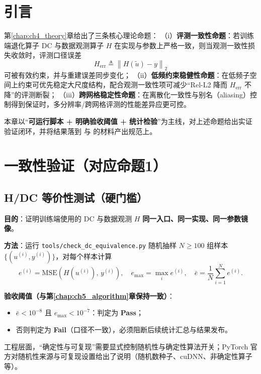 \section{引言}
第\ref{chap:ch4_theory}章给出了三条核心理论命题：
（i）\textbf{评测一致性命题}：若训练端退化算子 $\mathrm{DC}$ 与数据观测算子 $H$ 在实现与参数上严格一致，则当观测一致性损失收敛时，评测口径误差
\begin{equation}
H_{\mathrm{err}} \triangleq \left\| H(\tilde{u}) - y \right\|_2
\end{equation}
可被有效约束，并与重建误差同步变化；
（ii）\textbf{低频约束稳健性命题}：在低频子空间上约束可优先稳定大尺度结构，配合观测一致性项可减少“Rel-L2 降而 $H_{\mathrm{err}}$ 不降”的评测断裂；
（iii）\textbf{跨网格稳定性命题}：在离散化一致性与别名（aliasing）控制得到保证时，多分辨率/跨网格评测的性能差异应更可控。

本章以“\textbf{可运行脚本 + 明确验收阈值 + 统计检验}”为主线，对上述命题给出实证验证闭环，并将结果落到  与  的材料产出规范上。

\section{一致性验证（对应命题1）}

\subsection{H/DC 等价性测试（硬门槛）}
\textbf{目的}：证明训练端使用的 $\mathrm{DC}$ 与数据观测 $H$ \textbf{同一入口、同一实现、同一参数镜像}。

\textbf{方法}：运行 \texttt{tools/check\_dc\_equivalence.py} 随机抽样 $N\ge 100$ 组样本 $\{(u^{(i)}, y^{(i)})\}$，对每个样本计算
\begin{equation}
e^{(i)}=\mathrm{MSE}\!\left(H(u^{(i)}),\, y^{(i)}\right),
\quad
e_{\max}=\max_i e^{(i)},\quad
\bar{e}=\frac{1}{N}\sum_{i=1}^{N} e^{(i)}.
\end{equation}

\textbf{验收阈值（与第\ref{chap:ch5_algorithm}章保持一致）}：
\begin{itemize}
  \item $\bar{e} < 10^{-8}$ 且 $e_{\max} < 10^{-7}$：判定为 \textbf{Pass}；
  \item 否则判定为 \textbf{Fail}（口径不一致），必须阻断后续统计汇总与结果发布。
\end{itemize}

\noindent
工程层面，“确定性与可复现”需要显式控制随机性与确定性算法开关；PyTorch 官方对随机性来源与可复现设置给出了说明（随机数种子、cuDNN、非确定性算子等）\cite{pytorch_randomness}。

